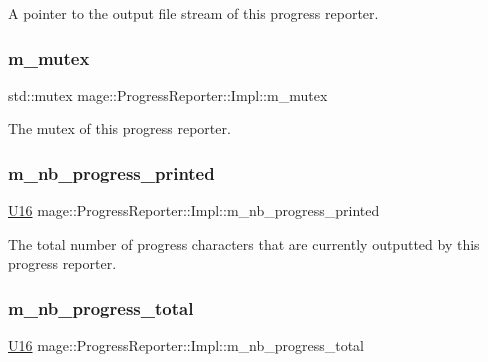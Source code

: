 A pointer to the output file stream of this progress reporter. \hypertarget{classmage_1_1_progress_reporter_1_1_impl_acc8b21e5c74a202b1fb8f80a26132bfc}{}\label{classmage_1_1_progress_reporter_1_1_impl_acc8b21e5c74a202b1fb8f80a26132bfc} 
\subsubsection{\texorpdfstring{m\+\_\+mutex}{m\_mutex}}
{\footnotesize\ttfamily std\+::mutex mage\+::\+Progress\+Reporter\+::\+Impl\+::m\+\_\+mutex\hspace{0.3cm}{\ttfamily [private]}}

The mutex of this progress reporter. \hypertarget{classmage_1_1_progress_reporter_1_1_impl_a06efb1bb26ffbba0cd26db5df79021f8}{}\label{classmage_1_1_progress_reporter_1_1_impl_a06efb1bb26ffbba0cd26db5df79021f8} 
\subsubsection{\texorpdfstring{m\+\_\+nb\+\_\+progress\+\_\+printed}{m\_nb\_progress\_printed}}
{\footnotesize\ttfamily \hyperlink{namespacemage_af69057eec1ce005c1c3b34ae33486f16}{U16} mage\+::\+Progress\+Reporter\+::\+Impl\+::m\+\_\+nb\+\_\+progress\+\_\+printed\hspace{0.3cm}{\ttfamily [private]}}

The total number of progress characters that are currently outputted by this progress reporter. \hypertarget{classmage_1_1_progress_reporter_1_1_impl_a286a47e68cdbae261b94dd238e1c9328}{}\label{classmage_1_1_progress_reporter_1_1_impl_a286a47e68cdbae261b94dd238e1c9328} 
\subsubsection{\texorpdfstring{m\+\_\+nb\+\_\+progress\+\_\+total}{m\_nb\_progress\_total}}
{\footnotesize\ttfamily \hyperlink{namespacemage_af69057eec1ce005c1c3b34ae33486f16}{U16} mage\+::\+Progress\+Reporter\+::\+Impl\+::m\+\_\+nb\+\_\+progress\+\_\+total\hspace{0.3cm}{\ttfamily [private]}}

